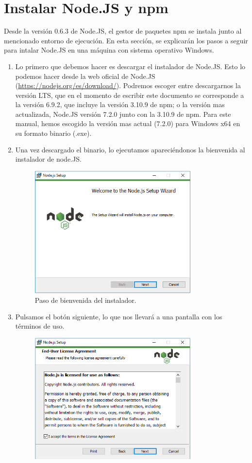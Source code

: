 \chapter{Instalar Node.JS y npm}
Desde la versión 0.6.3 de Node.JS, el gestor de paquetes \gls{npm} se instala junto al mencionado entorno de ejecución. En esta sección, se explicarán los pasos a seguir para intalar Node.JS en una máquina con sistema operativo Windows.

\begin{enumerate}
\item Lo primero que debemos hacer es descargar el instalador de Node.JS. Esto lo podemos hacer desde la web oficial de Node.JS (\url{https://nodejs.org/es/download/}). Podremos escoger entre descargarnos la versión \gls{LTS}, que en el momento de escribir este documento se corresponde a la versión 6.9.2, que incluye la versión 3.10.9 de \gls{npm}; o la versión mas actualizada, Node.JS versión 7.2.0 junto con la 3.10.9 de \gls{npm}. Para este manual, hemos escogido la versión mas actual (7.2.0) para Windows x64 en su formato binario (.exe).
\item Una vez descargado el binario, lo ejecutamos apareciéndonos la bienvenida al instalador de node.JS.
\begin{figure}[H]
\centering
  \includegraphics[width=0.8\textwidth]{Figures/anexo/anexoI/nodejs/1}
  \caption{Paso de bienvenida del instalador.}
\end{figure}
\item Pulsamos el botón siguiente, lo que nos llevará a una pantalla con los términos de uso.
\begin{figure}[H]
\centering
  \includegraphics[width=0.8\textwidth]{Figures/anexo/anexoI/nodejs/2}

\end{figure}
\end{enumerate}
